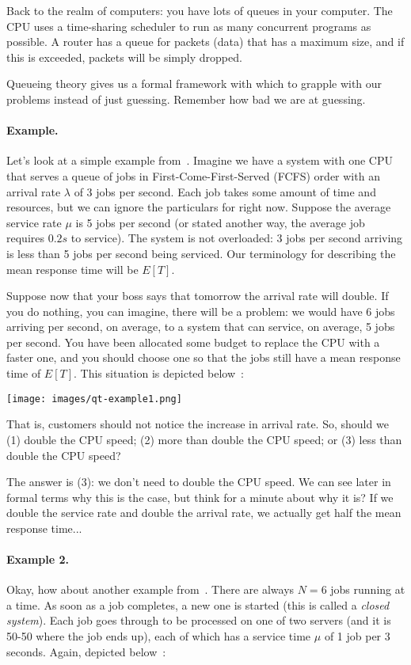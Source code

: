 Back to the realm of computers: you have lots of queues in your computer. The CPU uses a time-sharing scheduler to run as many concurrent programs as possible. A router has a queue for packets (data) that has a maximum size, and if this is exceeded, packets will be simply dropped. 

Queueing theory gives us a formal framework with which to grapple with our problems instead of just guessing. Remember how bad we are at guessing. 


\paragraph{Example.} Let's look at a simple example from~\cite{pmd}. Imagine we have a system with one CPU that serves a queue of jobs in First-Come-First-Served (FCFS) order with an arrival rate $\lambda$ of 3 jobs per second. Each job takes some amount of time and resources, but we can ignore the particulars for right now. Suppose the average service rate $\mu$ is 5 jobs per second (or stated another way, the average job requires $0.2s$ to service). The system is not overloaded: 3 jobs per second arriving is less than 5 jobs per second being serviced. Our terminology for describing the mean response time will be $E[T]$. 


Suppose now that your boss says that tomorrow the arrival rate will double. If you do nothing, you can imagine, there will be a problem: we would have 6 jobs arriving per second, on average, to a system that can service, on average, 5 jobs per second. You have been allocated some budget to replace the CPU with a faster one, and you should choose one so that the jobs still have a mean response time of $E[T]$. This situation is depicted below~\cite{pmd}:


\begin{center}
	\texttt{[image: images/qt-example1.png]}
\end{center}

That is, customers should not notice the increase in arrival rate. So, should we (1) double the CPU speed; (2) more than double the CPU speed; or (3) less than double the CPU speed?

The answer is (3): we don't need to double the CPU speed. We can see later in formal terms why this is the case, but think for a minute about why it is? If we double the service rate and double the arrival rate, we actually get half the mean response time...

\paragraph{Example 2.} Okay, how about another example from~\cite{pmd}. There are always $N=6$ jobs running at a time. As soon as a job completes, a new one is started (this is called a \textit{closed system}). Each job goes through to be processed on one of two servers (and it is 50-50 where the job ends up), each of which has a service time $\mu$ of 1 job per 3 seconds. Again, depicted below~\cite{pmd}:


